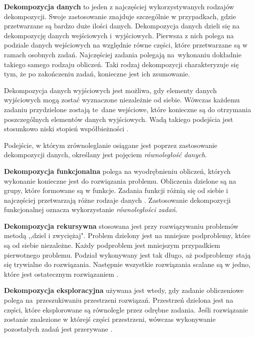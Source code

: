 \documentclass[12pt]{article}
\begin{document}
\textbf{Dekompozycja danych} to jeden z najczęściej wykorzystywanych rodzajów dekompozycji. Swoje zastosowanie znajduje szczególnie w przypadkach,
gdzie przetwarzane są bardzo duże ilości danych. Dekompozycja danych dzieli się na dekompozycję danych wejściowych i~wyjściowych.
Pierwsza z nich polega na podziale danych wejściowych na względnie równe części, które przetwarzane są w ramach osobnych zadań. Najczęściej
zadania polegają na~wykonaniu dokładnie takiego samego rodzaju obliczeń. Taki rodzaj dekompozycji charakteryzuje się tym,
że po zakończeniu zadań, konieczne jest ich zsumowanie.

Dekompozycja danych wyjściowych jest możliwa, gdy elementy danych wyjściowych mogą zostać wyznaczone niezależnie od siebie.
Wówczas każdemu zadaniu przydzielone zostają te~dane wejściowe, które konieczne są do otrzymania poszczególnych elementów
danych wyjściowych. Wadą takiego podejścia jest stosunkowo niski stopień współbieżności \cite{wprowadzenie-do-obliczen-rownoleglych}.

Podejście, w którym zrównoleglanie osiągane jest poprzez zastosowanie dekompozycji danych, określany jest pojęciem
\textit{równoległość danych}. 

\textbf{Dekompozycja funkcjonalna} polega na wyodrębnieniu obliczeń, których wykonanie konieczne jest do rozwiązania problemu. Obliczenia dzielone są
na grupy, które formowane są w funkcje. Zadania funkcji różnią się od siebie i najczęściej przetwarzają różne rodzaje danych
\cite{wprowadzenie-do-obliczen-rownoleglych}.
Zastosowanie dekompozycji funkcjonalnej oznacza wykorzystanie \textit{równoległości zadań}.

\textbf{Dekompozycja rekursywna} stosowana jest przy rozwiązywaniu problemów metodą ,,dziel i zwyciężaj". Problem dzielony jest na
mniejsze podproblemy, które są od siebie niezależne. Każdy podproblem jest mniejszym przypadkiem pierwotnego problemu. Podział
wykonywany jest tak długo, aż podproblemy stają się trywialne do rozwiązania. Następnie wszystkie rozwiązania scalane są w jedno,
które jest ostatecznym rozwiązaniem \cite{wprowadzenie-do-obliczen-rownoleglych}.

\textbf{Dekompozycja eksploracyjna} używana jest wtedy, gdy zadanie obliczeniowe polega na~przeszukiwaniu przestrzeni rozwiązań. Przestrzeń dzielona
jest na części, które eksplorowane są równolegle przez odrębne zadania. Jeśli rozwiązanie zostanie znalezione w którejś części przestrzeni,
wówczas wykonywanie pozostałych zadań jest przerywane \cite{wprowadzenie-do-obliczen-rownoleglych}.
\end{document}
